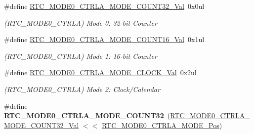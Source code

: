 \begin{DoxyCompactItemize}
\item 
\hypertarget{group___s_a_m_l21___r_t_c_ga9c4b13fbec7854d5f407494fddb412bf}{}\#define \hyperlink{group___s_a_m_l21___r_t_c_ga9c4b13fbec7854d5f407494fddb412bf}{R\+T\+C\+\_\+\+M\+O\+D\+E0\+\_\+\+C\+T\+R\+L\+A\+\_\+\+M\+O\+D\+E\+\_\+\+C\+O\+U\+N\+T32\+\_\+\+Val}~0x0ul\label{group___s_a_m_l21___r_t_c_ga9c4b13fbec7854d5f407494fddb412bf}

\begin{DoxyCompactList}\small\item\em (R\+T\+C\+\_\+\+M\+O\+D\+E0\+\_\+\+C\+T\+R\+L\+A) Mode 0\+: 32-\/bit Counter \end{DoxyCompactList}\item 
\hypertarget{group___s_a_m_l21___r_t_c_ga8a10d7200f84743b92062578a08b92b1}{}\#define \hyperlink{group___s_a_m_l21___r_t_c_ga8a10d7200f84743b92062578a08b92b1}{R\+T\+C\+\_\+\+M\+O\+D\+E0\+\_\+\+C\+T\+R\+L\+A\+\_\+\+M\+O\+D\+E\+\_\+\+C\+O\+U\+N\+T16\+\_\+\+Val}~0x1ul\label{group___s_a_m_l21___r_t_c_ga8a10d7200f84743b92062578a08b92b1}

\begin{DoxyCompactList}\small\item\em (R\+T\+C\+\_\+\+M\+O\+D\+E0\+\_\+\+C\+T\+R\+L\+A) Mode 1\+: 16-\/bit Counter \end{DoxyCompactList}\item 
\hypertarget{group___s_a_m_l21___r_t_c_gabcfe026e99e9b79b5bcf463788a1c8a3}{}\#define \hyperlink{group___s_a_m_l21___r_t_c_gabcfe026e99e9b79b5bcf463788a1c8a3}{R\+T\+C\+\_\+\+M\+O\+D\+E0\+\_\+\+C\+T\+R\+L\+A\+\_\+\+M\+O\+D\+E\+\_\+\+C\+L\+O\+C\+K\+\_\+\+Val}~0x2ul\label{group___s_a_m_l21___r_t_c_gabcfe026e99e9b79b5bcf463788a1c8a3}

\begin{DoxyCompactList}\small\item\em (R\+T\+C\+\_\+\+M\+O\+D\+E0\+\_\+\+C\+T\+R\+L\+A) Mode 2\+: Clock/\+Calendar \end{DoxyCompactList}\item 
\hypertarget{group___s_a_m_l21___r_t_c_ga5173af74d5775561e7fa1918972b6303}{}\#define {\bfseries R\+T\+C\+\_\+\+M\+O\+D\+E0\+\_\+\+C\+T\+R\+L\+A\+\_\+\+M\+O\+D\+E\+\_\+\+C\+O\+U\+N\+T32}~(\hyperlink{group___s_a_m_l21___r_t_c_ga9c4b13fbec7854d5f407494fddb412bf}{R\+T\+C\+\_\+\+M\+O\+D\+E0\+\_\+\+C\+T\+R\+L\+A\+\_\+\+M\+O\+D\+E\+\_\+\+C\+O\+U\+N\+T32\+\_\+\+Val} $<$$<$ \hyperlink{group___s_a_m_l21___r_t_c_ga2f001f07dca26979505852573f1bb701}{R\+T\+C\+\_\+\+M\+O\+D\+E0\+\_\+\+C\+T\+R\+L\+A\+\_\+\+M\+O\+D\+E\+\_\+\+Pos})\label{group___s_a_m_l21___r_t_c_ga5173af74d5775561e7fa1918972b6303}


\end{DoxyCompactItemize}
